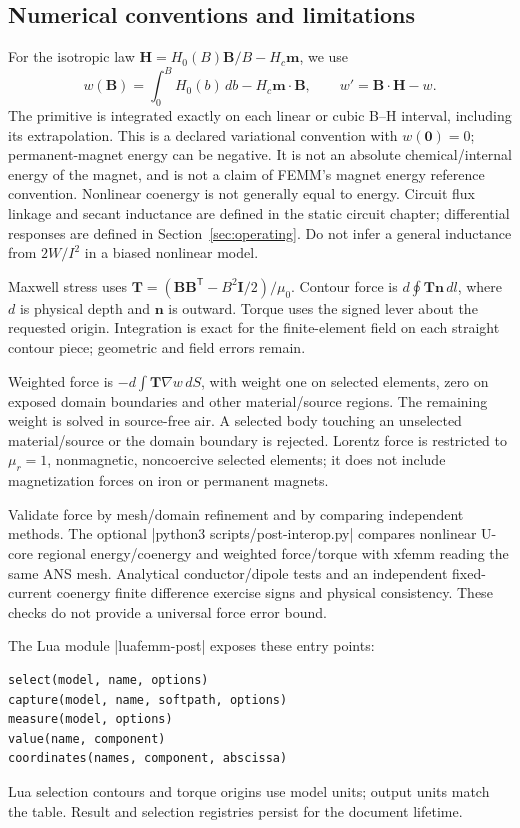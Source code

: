\subsection{Numerical conventions and limitations}
For the isotropic law $\mathbf H=H_0(B)\mathbf B/B-H_c\mathbf m$, we use
\[
 w(\mathbf B)=\int_0^B H_0(b)\,db-H_c\mathbf m\cdot\mathbf B,
 \qquad w'=\mathbf B\cdot\mathbf H-w.
\]
The primitive is integrated exactly on each linear or cubic B--H interval,
including its extrapolation. This is a declared variational convention with
$w(\mathbf0)=0$; permanent-magnet energy can be negative. It is not an absolute
chemical/internal energy of the magnet, and is not a claim of FEMM's magnet
energy reference convention. Nonlinear coenergy is not generally equal to
energy. Circuit flux linkage and secant inductance are defined in the static
circuit chapter; differential responses are defined in Section~\ref{sec:operating}.
Do not infer a general inductance from $2W/I^2$ in a biased nonlinear model.

Maxwell stress uses $\mathbf T=(\mathbf B\mathbf B^{\mathsf T}
-B^2\mathbf I/2)/\mu_0$. Contour force is $d\oint\mathbf T\mathbf n\,dl$,
where $d$ is physical depth and $\mathbf n$ is outward. Torque uses the signed
lever about the requested origin. Integration is exact for the finite-element
field on each straight contour piece; geometric and field errors remain.

Weighted force is $-d\int\mathbf T\nabla w\,dS$, with weight one on selected
elements, zero on exposed domain boundaries and other material/source regions.
The remaining weight is solved in source-free air. A selected body touching an
unselected material/source or the domain boundary is rejected. Lorentz force
is restricted to $\mu_r=1$, nonmagnetic, noncoercive selected elements; it does
not include magnetization forces on iron or permanent magnets.

Validate force by mesh/domain refinement and by comparing independent methods.
The optional |python3 scripts/post-interop.py| compares nonlinear U-core regional
energy/coenergy and weighted force/torque with xfemm reading the same ANS mesh.
Analytical conductor/dipole tests and an independent fixed-current coenergy
finite difference exercise signs and physical consistency. These checks do not
provide a universal force error bound.

The Lua module |luafemm-post| exposes these entry points:
\begin{verbatim}
select(model, name, options)
capture(model, name, softpath, options)
measure(model, options)
value(name, component)
coordinates(names, component, abscissa)
\end{verbatim}
Lua selection contours and torque origins use model units; output units match
the table. Result and selection registries persist for the document lifetime.

